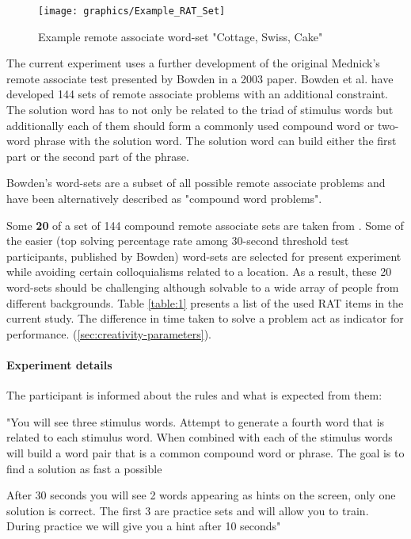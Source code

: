		\begin{figure}[h]
			\centering
			\texttt{[image: graphics/Example\_RAT\_Set]}
			\caption{Example remote associate word-set "Cottage, Swiss, Cake"}
			\label{fig:exampleratset}
		\end{figure}

		The current experiment uses a further development of the original Mednick's remote associate test presented by Bowden in a 2003 paper. Bowden et al. \cite{Bowden} have developed 144 sets of remote associate problems with an additional constraint. The solution word has to not only be related to the triad of stimulus words but additionally each of them should form a commonly used compound word or two-word phrase with the solution word. The solution word can build either the first part or the second part of the phrase.
		
		Bowden's word-sets are a subset of all possible remote associate problems and have been alternatively described as "compound word problems".
		
		
		Some \textbf{20} of a set of 144 compound remote associate sets are taken from \cite{Bowden}. Some of the easier (top solving percentage rate among 30-second threshold test participants, published by Bowden) word-sets are selected for present experiment while avoiding certain colloquialisms related to a location. As a result, these 20 word-sets should be challenging although solvable to a wide array of people from different backgrounds. Table \ref{table:1} presents a list of the used RAT items in the current study. The difference in time taken to solve a problem act as indicator for performance. (\ref{sec:creativity-parameters}).
		
		\paragraph{Experiment details}
		
		The participant is informed about the rules and what is expected from them:
		
		\begin{displayquote}
			"You will see three stimulus words. Attempt to generate a fourth word that is related to each stimulus word. When combined with each of the stimulus words will build a word pair that is a common compound word or phrase. The goal is to find a solution as fast a possible
			
			After 30 seconds you will see 2 words appearing as hints on the screen, only one solution is correct.
			The first 3 are practice sets and will allow you to train. During practice we will give you a hint after 10 seconds"
		\end{displayquote}
	

